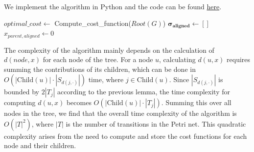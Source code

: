 \documentclass{article}
\begin{document}
We implement the algorithm in Python and the code can be found \href{https://gitlab-student.centralesupelec.fr/ngoc-long.tran/parcours-recherche-time-aware-conformance-checking-and-model-repair/-/blob/9061323f09b85597fb2573d32ab0714499497fdb/modele_arborescent_stamp_only.py}{here}.
\begin{algorithm}[H]
    \caption{Aligning a timed trace with a Tree-like Time Petri Net under Stamp Only Distance}
    \SetAlgoLined
    $optimal\_cost \gets$ Compute\_cost\_function($Root(G)$)\;
    $\boldsymbol{\sigma_{aligned}} \gets []$\; 
    $x_{parent,aligned} \gets 0$\;
    \;
\end{algorithm}

The complexity of the algorithm mainly depends on the 
calculation of $d(node,x)$ for each node of the tree. For 
a node $u$, calculating $d(u,x)$ requires summing the 
contributions of its children, which can be done in 
$O(|\text{Child}(u)| \cdot |S_{d(j,\cdot)}|)$ time, where 
$j \in \text{Child}(u)$. Since $|S_{d(j,\cdot)}|$ is bounded 
by $2|T_j|$ according to the previous lemma, the time 
complexity for computing $d(u,x)$ becomes 
$O(|\text{Child}(u)| \cdot |T_j|)$. Summing this over 
all nodes in the tree, we find that the overall time 
complexity of the algorithm is $O(|T|^2)$, where $|T|$ 
is the number of transitions in the Petri net. This quadratic 
complexity arises from the need to compute and store the cost 
functions for each node and their children.
\end{document}
